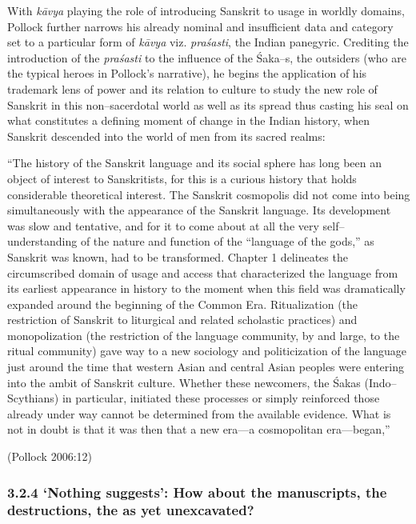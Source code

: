 With \textit{kāvya} playing the role of introducing Sanskrit to usage in worldly domains, Pollock further narrows his already nominal and insufficient data and category set to a particular form of \textit{kāvya} viz. \textit{praśasti}, the Indian panegyric. Crediting the introduction of the \textit{praśasti} to the influence of the Śaka–s, the outsiders (who are the typical heroes in Pollock’s narrative), he begins the application of his trademark lens of power and its relation to culture to study the new role of Sanskrit in this non–sacerdotal world as well as its spread thus casting his seal on what constitutes a defining moment of change in the Indian history, when Sanskrit descended into the world of men from its sacred realms:

\begin{myquote}
“The history of the Sanskrit language and its social sphere has long been an object of interest to Sanskritists, for this is a curious history that holds considerable theoretical interest. The Sanskrit cosmopolis did not come into being simultaneously with the appearance of the Sanskrit language. Its development was slow and tentative, and for it to come about at all the very self–understanding of the nature and function of the “language of the gods,” as Sanskrit was known, had to be transformed. Chapter 1 delineates the circumscribed domain of usage and access that characterized the language from its earliest appearance in history to the moment when this field was dramatically expanded around the beginning of the Common Era. Ritualization (the restriction of Sanskrit to liturgical and related scholastic practices) and monopolization (the restriction of the language community, by and large, to the ritual community) gave way to a new sociology and politicization of the language just around the time that western Asian and central Asian peoples were entering into the ambit of Sanskrit culture. Whether these newcomers, the Śakas (Indo–Scythians) in particular, initiated these processes or simply reinforced those already under way cannot be determined from the available evidence. What is not in doubt is that it was then that a new era—a cosmopolitan era—began,” 
\end{myquote}

\hfill (Pollock 2006:12)


\subsubsection*{3.2.4 ‘Nothing suggests’: How about the manuscripts, the destructions, the as yet unexcavated?}

